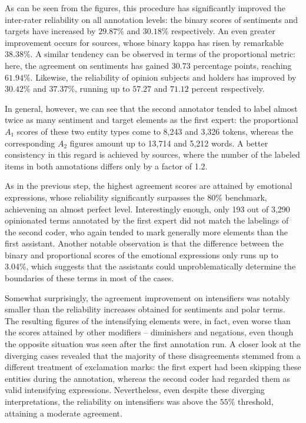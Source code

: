 As can be seen from the figures, this procedure has significantly
improved the inter-rater reliability on all annotation levels: the
binary scores of sentiments and targets have increased by $29.87\%$
and $30.18\%$ respectively.  An even greater improvement occurs for
sources, whose binary kappa has risen by remarkable $38.38\%$.  A
similar tendency can be observed in terms of the proportional metric:
here, the agreement on sentiments has gained 30.73 percentage points,
reaching $61.94\%$.  Likewise, the reliability of opinion subjects and
holders has improved by $30.42\%$ and $37.37\%$, running up to $57.27$
and $71.12$ percent respectively.

In general, however, we can see that the second annotator tended to
label almost twice as many sentiment and target elements as the first
expert: the proportional $A_1$ scores of these two entity types come
to 8,243 and 3,326 tokens, whereas the corresponding $A_2$ figures
amount up to 13,714 and 5,212 words.  A better consistency in this
regard is achieved by sources, where the number of the labeled items
in both annotations differs only by a factor of 1.2.

As in the previous step, the highest agreement scores are attained by
emotional expressions, whose reliability significantly surpasses the
80\% benchmark, achievening an almost perfect level.  Interestingly
enough, only 193 out of 3,290 opinionated terms annotated by the first
expert did not match the labelings of the second coder, who again
tended to mark generally more elements than the first assistant.
Another notable observation is that the difference between the binary
and proportional scores of the emotional expressions only runs up to
3.04\%, which suggests that the assistants could unproblematically
determine the boundaries of these terms in most of the cases.

Somewhat surprisingly, the agreement improvement on intensifiers was
notably smaller than the reliability increases obtained for sentiments
and polar terms.  The resulting figures of the intensifying elements
were, in fact, even worse than the scores attained by other modifiers
-- diminishers and negations, even though the opposite situation was
seen after the first annotation run.  A closer look at the diverging
cases revealed that the majority of these disagreements stemmed from a
different treatment of exclamation marks: the first expert had been
skipping these entities during the annotation, whereas the second
coder had regarded them as valid intensifying expressions.
Nevertheless, even despite these diverging interpretations, the
reliability on intensifiers was above the $55\%$ threshold, attaining
a moderate agreement.

